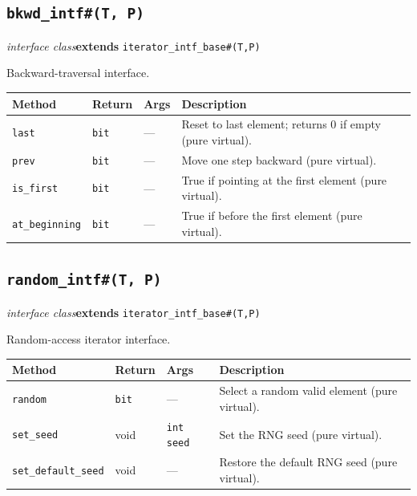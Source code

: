 \documentclass[11pt,letterpaper]{report}
\begin{document}
\subsection*{\texttt{bkwd\_intf\#(T, P)}}
\noindent\small\textit{interface class}\quad \textbf{extends} \texttt{iterator\_intf\_base\#(T,P)}\par

Backward-traversal interface.

\begin{xltabular}{\linewidth}{>{\small}p{1.35in} >{\small}p{1.25in} >{\small}p{0.95in} >{\small}X}
\toprule
\textbf{Method} & \textbf{Return} & \textbf{Args} & \textbf{Description} \\
\midrule
\endhead
\bottomrule
\endfoot
\texttt{last} & \texttt{bit} & --- & Reset to last element; returns 0 if empty (pure virtual). \\
\texttt{prev} & \texttt{bit} & --- & Move one step backward (pure virtual). \\
\texttt{is\_first} & \texttt{bit} & --- & True if pointing at the first element (pure virtual). \\
\texttt{at\_beginning} & \texttt{bit} & --- & True if before the first element (pure virtual). \\
\end{xltabular}

\subsection*{\texttt{random\_intf\#(T, P)}}
\noindent\small\textit{interface class}\quad \textbf{extends} \texttt{iterator\_intf\_base\#(T,P)}\par

Random-access iterator interface.

\begin{xltabular}{\linewidth}{>{\small}p{1.35in} >{\small}p{1.25in} >{\small}p{0.95in} >{\small}X}
\toprule
\textbf{Method} & \textbf{Return} & \textbf{Args} & \textbf{Description} \\
\midrule
\endhead
\bottomrule
\endfoot
\texttt{random} & \texttt{bit} & --- & Select a random valid element (pure virtual). \\
\texttt{set\_seed} & void & \texttt{int seed} & Set the RNG seed (pure virtual). \\
\texttt{set\_default\_seed} & void & --- & Restore the default RNG seed (pure virtual). \\
\end{xltabular}
\end{document}
